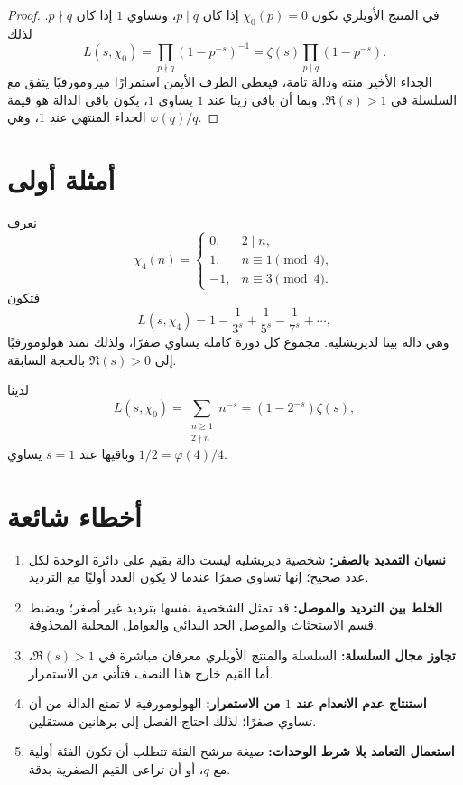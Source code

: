 \begin{proof}
في المنتج الأويلري تكون \(\chi_0(p)=0\) إذا كان \(p\mid q\)، وتساوي
\(1\) إذا كان \(p\nmid q\). لذلك
\[
L(s,\chi_0)
=
\prod_{p\nmid q}(1-p^{-s})^{-1}
=
\zeta(s)\prod_{p\mid q}(1-p^{-s}).
\]
الجداء الأخير منته ودالة تامة، فيعطي الطرف الأيمن استمرارًا ميرومورفيًا
يتفق مع السلسلة في \(\Re(s)>1\). وبما أن باقي زيتا عند \(1\) يساوي
\(1\)، يكون باقي الدالة هو قيمة الجداء المنتهي عند \(1\)، وهي
\(\varphi(q)/q\).
\end{proof}

\section{أمثلة أولى}

\begin{example}
نعرف
\[
\chi_4(n)=
\begin{cases}
0,&2\mid n,\\
1,&n\equiv1\pmod4,\\
-1,&n\equiv3\pmod4.
\end{cases}
\]
فتكون
\[
L(s,\chi_4)
=
1-\frac1{3^s}+\frac1{5^s}-\frac1{7^s}+\cdots,
\]
وهي دالة بيتا لديريشليه. مجموع كل دورة كاملة يساوي صفرًا، ولذلك تمتد
هولومورفيًا إلى \(\Re(s)>0\) بالحجة السابقة.
\end{example}

\begin{example}
لدينا
\[
L(s,\chi_0)
=
\sum_{\substack{n\geq1\\2\nmid n}}n^{-s}
=
(1-2^{-s})\zeta(s),
\]
وباقيها عند \(s=1\) يساوي \(1/2=\varphi(4)/4\).
\end{example}

\section{أخطاء شائعة}

\begin{enumerate}
  \item \textbf{نسيان التمديد بالصفر:} شخصية ديريشليه ليست دالة بقيم على
  دائرة الوحدة لكل عدد صحيح؛ إنها تساوي صفرًا عندما لا يكون العدد أوليًا
  مع الترديد.
  \item \textbf{الخلط بين الترديد والموصل:} قد تمثل الشخصية نفسها بترديد
  غير أصغر؛ ويضبط قسم الاستحثاث والموصل الجد البدائي والعوامل المحلية
  المحذوفة.
  \item \textbf{تجاوز مجال السلسلة:} السلسلة والمنتج الأويلري معرفان
  مباشرة في \(\Re(s)>1\)، أما القيم خارج هذا النصف فتأتي من الاستمرار.
  \item \textbf{استنتاج عدم الانعدام عند \(1\) من الاستمرار:} الهولومورفية
  لا تمنع الدالة من أن تساوي صفرًا؛ لذلك احتاج الفصل إلى برهانين مستقلين.
  \item \textbf{استعمال التعامد بلا شرط الوحدات:} صيغة مرشح الفئة تتطلب
  أن تكون الفئة أولية مع \(q\)، أو أن تراعى القيم الصفرية بدقة.
\end{enumerate}


